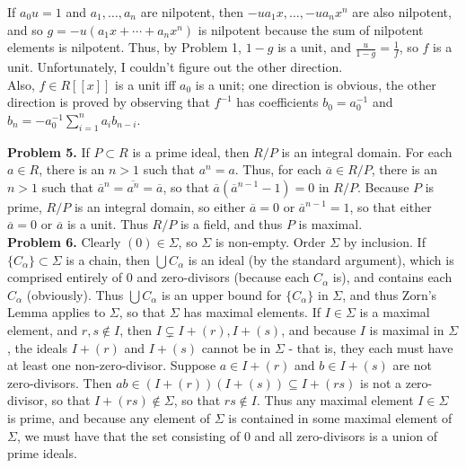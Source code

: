 \documentclass[11pt]{article}
\newcommand{\num}[1]{\noindent \textbf{#1}}
\theoremstyle{definition}
\begin{document}
If $a_0u=1$ and $a_1,\ldots,a_n$ are nilpotent, then $-ua_1x,\ldots,-ua_nx^n$
are also nilpotent, and so $g=-u(a_1x+\cdots+a_nx^n)$ is nilpotent because
the sum of nilpotent elements is nilpotent. Thus, by Problem 1, $1-g$ is
a unit, and $\frac{u}{1-g}=\frac{1}{f}$, so $f$ is a unit. Unfortunately,
I couldn't figure out the other direction.    \\

Also, $f\in R[[x]]$ is a unit iff $a_0$ is a unit; one direction is obvious,
the other direction is proved by observing that $f^{-1}$ has coefficients
$b_0=a_0^{-1}$ and $b_n=-a_0^{-1}\sum_{i=1}^n a_ib_{n-i}$.    \\

\pagebreak

\num{Problem 5.} If $P\subset R$ is a prime ideal, then $R/P$
is an integral domain. For each $a\in R$, there is an $n>1$ such
that $a^n=a$. Thus, for each $\overline{a}\in R/P$, there is an
$n>1$ such that $\overline{a}^n=\overline{a^n}=\overline{a}$, so that
$\overline{a}(\overline{a}^{n-1}-1)=0$ in $R/P$. Because $P$ is prime, $R/P$
is an integral domain, so either $\overline{a}=0$ or $\overline{a}^{n-1}=1$,
so that either $\overline{a}=0$ or $\overline{a}$ is a unit. Thus $R/P$
is a field, and thus $P$ is maximal. \\

\num{Problem 6.} Clearly $(0)\in\Sigma$, so $\Sigma$ is non-empty. Order
$\Sigma$ by inclusion. If $\{C_\alpha\}\subset\Sigma$ is a chain, then
$\bigcup C_\alpha$ is an ideal (by the standard argument), which is comprised
entirely of 0 and zero-divisors (because each $C_\alpha$ is), and contains
each $C_\alpha$ (obviously). Thus $\bigcup C_\alpha$ is an upper bound for
$\{C_\alpha\}$ in $\Sigma$, and thus Zorn's Lemma applies to $\Sigma$, so
that $\Sigma$ has maximal elements. If $I\in\Sigma$ is a maximal element, and
$r,s\notin I$, then $I\subsetneq I+(r), I+(s)$, and because $I$ is maximal
in $\Sigma$, the ideals $I+(r)$ and $I+(s)$ cannot be in $\Sigma$ - that
is, they each must have at least one non-zero-divisor. Suppose $a\in I+(r)$
and $b\in I+(s)$ are not zero-divisors. Then $ab\in (I+(r))(I+(s))\subseteq
I+(rs)$ is not a zero-divisor, so that $I+(rs)\notin\Sigma$, so that $rs\notin
I$. Thus any maximal element $I\in\Sigma$ is prime, and because any element of
$\Sigma$ is contained in some maximal element of $\Sigma$, we must have that
the set consisting of 0 and all zero-divisors is a union of prime ideals.   \\
\end{document}
